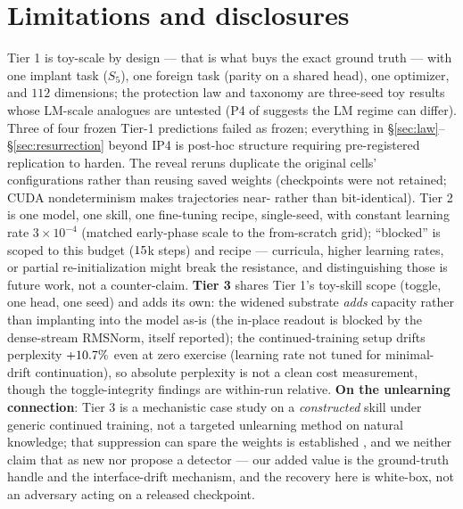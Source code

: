 \documentclass[10pt]{article}
\begin{document}
\section{Limitations and disclosures}
Tier 1 is toy-scale by design --- that is what buys the exact ground truth --- with one implant
task ($S_5$), one foreign task (parity on a shared head), one optimizer, and $112$ dimensions; the
protection law and taxonomy are three-seed toy results whose LM-scale analogues are untested
(P4 of \citealt{howe2026hygiene} suggests the LM regime can differ). Three of four frozen Tier-1
predictions failed as frozen; everything in \S\ref{sec:law}--\S\ref{sec:resurrection} beyond IP4
is post-hoc structure requiring pre-registered replication to harden. The reveal reruns duplicate
the original cells' configurations rather than reusing saved weights (checkpoints were not
retained; CUDA nondeterminism makes trajectories near- rather than bit-identical). Tier 2 is one
model, one skill, one fine-tuning recipe, single-seed, with constant learning rate $3\times10^{-4}$
(matched early-phase scale to the from-scratch grid); ``blocked'' is scoped to this budget
($15$k steps) and recipe --- curricula, higher learning rates, or partial
re-initialization might break the resistance, and distinguishing those is future work, not a
counter-claim. \textbf{Tier 3} shares Tier 1's toy-skill scope (toggle, one head, one seed) and
adds its own: the widened substrate \emph{adds} capacity rather than implanting into the model
as-is (the in-place readout is blocked by the dense-stream RMSNorm, itself reported); the
continued-training setup drifts perplexity $+10.7\%$ even at zero exercise (learning
rate not tuned for minimal-drift continuation), so absolute perplexity is not a clean cost
measurement, though the toggle-integrity findings are within-run relative. \textbf{On the
unlearning connection}: Tier 3 is a mechanistic case study on a \emph{constructed} skill under
generic continued training, not a targeted unlearning method on natural knowledge; that
suppression can spare the weights is established \citep{deeb2024weights,lee2026uds,xu2026reversibility},
and we neither claim that as new nor propose a detector --- our added value is the ground-truth
handle and the interface-drift mechanism, and the recovery here is white-box, not an adversary
acting on a released checkpoint.
\end{document}
